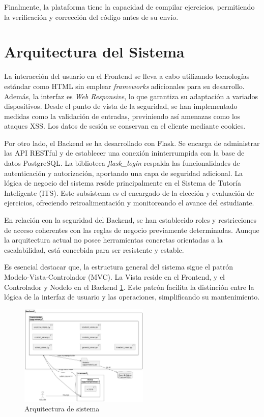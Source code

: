 Finalmente, la plataforma tiene la capacidad de compilar ejercicios, permitiendo la verificación y corrección del código antes de su envío.

\section{Arquitectura del Sistema}

La interacción del usuario en el Frontend se lleva a cabo utilizando tecnologías estándar como HTML sin emplear \textit{frameworks} adicionales para su desarrollo. Además, la interfaz es \textit{Web Responsive}, lo que garantiza su adaptación a variados dispositivos. Desde el punto de vista de la seguridad, se han implementado medidas como la validación de entradas, previniendo así amenazas como los ataques XSS. Los datos de sesión se conservan en el cliente mediante cookies.

Por otro lado, el Backend se ha desarrollado con Flask. Se encarga de administrar las API RESTful y de establecer una conexión ininterrumpida con la base de datos PostgreSQL. La biblioteca \textit{flask\_login} respalda las funcionalidades de autenticación y autorización, aportando una capa de seguridad adicional. La lógica de negocio del sistema reside principalmente en el Sistema de Tutoría Inteligente (ITS). Este subsistema es el encargado de la elección y evaluación de ejercicios, ofreciendo retroalimentación y monitoreando el avance del estudiante.

En relación con la seguridad del Backend, se han establecido roles y restricciones de acceso coherentes con las reglas de negocio previamente determinadas. Aunque la arquitectura actual no posee herramientas concretas orientadas a la escalabilidad, está concebida para ser resistente y estable.

Es esencial destacar que, la estructura general del sistema sigue el patrón Modelo-Vista-Controlador (MVC). La Vista reside en el Frontend, y el Controlador y Nodelo en el Backend \ref{fig:arqsistema}. Este patrón facilita la distinción entre la lógica de la interfaz de usuario y las operaciones, simplificando su mantenimiento.

\begin{figure}[H]
    \centering
    \includegraphics[width=0.55\textwidth]{imagenes/ArquitecturaDeSistema.jpeg}
    
    \caption{Arquitectura de sistema}
    \label{fig:arqsistema}
\end{figure}

